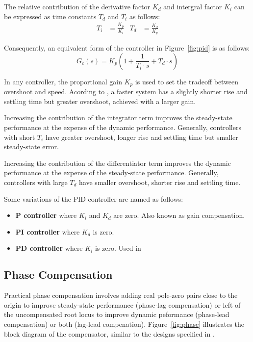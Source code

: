 \documentclass[a4paper,10pt,twocolumn]{article}
\begin{document}
The relative contribution of the derivative factor $K_d$ and intergral factor $K_i$ can be expressed as time constants $T_d$ and $T_i$ as follows:
\begin{align} \label{eq:T_i}
	T_i &= \frac{K_p}{K_i} & T_d &= \frac{K_d}{K_p}
\end{align}

Consequently, an equivalent form of the controller in Figure~\ref{fig:pid} is as follows:
\begin{equation}
	G_c(s) = K_p\left(1 + \frac{1}{T_i \cdot s} + T_d \cdot s\right)
\end{equation}

In any controller, the proportional gain $K_p$ is used to set the tradeoff between overshoot and speed. Acording to \cite[p.~483]{dorf2010modern}, a faster system has a slightly shorter rise and settling time but greater overshoot, achieved with a larger gain.

Increasing the contribution of the integrator term improves the steady-state performance at the expense of the dynamic performance. Generally, controllers with short $T_i$ have greater overshoot, longer rise and settling time but smaller steady-state error.

Increasing the contribution of the differentiator term improves the dynamic performance at the expense of the steady-state performance. Generally, controllers with large $T_d$ have smaller overshoot, shorter rise and settling time.

Some variations of the PID controller are named as follows:
\begin{itemize} \itemsep0pt
	\item \textbf{P controller} where $K_i$ and $K_d$ are zero. Also known as gain compensation.
	\item \textbf{PI controller} where $K_d$ is zero.
	\item \textbf{PD controller} where $K_i$ is zero. Used in 
\end{itemize}

\subsection{Phase Compensation}

Practical phase compensation involves adding real pole-zero pairs close to the origin to improve steady-state performance (phase-lag compensation) or left of the uncompensated root locus to improve dynamic peformance (phase-lead compensation) or both (lag-lead compenation). Figure~\ref{fig:phase} illustrates the block diagram of the compensator, similar to the designs specified in \cite[pp.~421--423]{ogata2002modern}.
\end{document}

